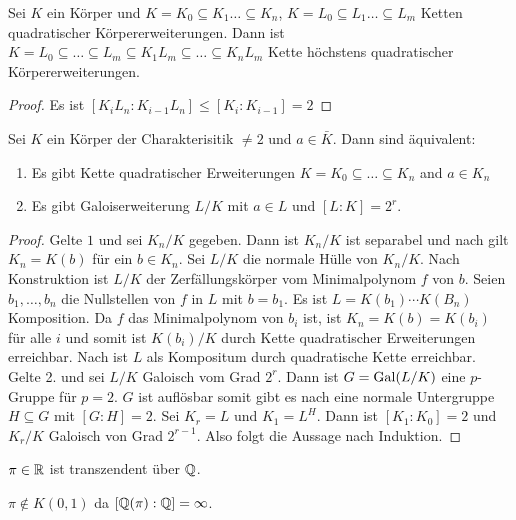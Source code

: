 \begin{Lemma}\label{Lem:KompQuad}
	Sei \(K\) ein Körper und \(K=K_0\subseteq K_1\dots\subseteq K_n\), \(K=L_0\subseteq L_1\dots\subseteq L_m\) Ketten quadratischer Körpererweiterungen.
	Dann ist \(K=L_0\subseteq \dots\subseteq L_m\subseteq K_1L_m\subseteq\dots \subseteq K_nL_m\) Kette höchstens quadratischer Körpererweiterungen.
\end{Lemma}
\begin{proof}
	Es ist \([K_iL_n:K_{i-1}L_n]\leq [K_i:K_{i-1}]=2\)
\end{proof}
\begin{Satz}
	Sei \(K\) ein Körper der Charakterisitik \(\neq 2\) und \(a\in\bar K\). Dann sind äquivalent:
	\begin{enumerate}
		\item Es gibt Kette quadratischer Erweiterungen \(K=K_0\subseteq \dots\subseteq K_n\) and \(a\in K_n\)
		\item Es gibt Galoiserweiterung \(L/K\) mit \(a\in L\) und \([L:K]=2^r\).
	\end{enumerate}
\end{Satz}
\begin{proof}
	Gelte \(1\) und sei \(K_n/K\) gegeben. Dann ist \(K_n/K\) ist separabel und nach  gilt \(K_n=K(b)\) für ein \(b\in K_n\). Sei \(L/K\) die normale Hülle von \(K_n/K\). Nach Konstruktion ist \(L/K\) der Zerfällungskörper vom Minimalpolynom \(f\) von \(b\). Seien \(b_1,\dots,b_n\) die Nullstellen von \(f\) in \(L\) mit \(b=b_1.\) Es ist \(L=K(b_1)\cdots K(B_n)\) Komposition. Da \(f\) das Minimalpolynom von \(b_i\) ist, ist \(K_n=K(b)=K(b_i)\) für alle \(i\) und somit ist \(K(b_i)/K\) durch Kette quadratischer Erweiterungen erreichbar. Nach  ist \(L\) als Kompositum durch quadratische Kette erreichbar. Gelte 2. und sei \(L/K\) Galoisch vom Grad \(2^r\). Dann ist \(G=\operatorname{Gal}(L/K)\) eine \(p\)-Gruppe für \(p=2\).
	\(G\) ist auflösbar somit gibt es nach  eine normale Untergruppe \(H\subseteq G\) mit \([G:H]=2\).
	Sei \(K_r=L\) und \(K_1=L^H\). Dann ist \([K_1:K_0]=2\) und \(K_r/K\) Galoisch von Grad \(2^{r-1}\). Also folgt die Aussage nach Induktion.
\end{proof}
\begin{Satz}
	\(\pi\in\mathbb{R}\) ist transzendent über \(\mathbb{Q}\).
\end{Satz}
\begin{Kor}
	\(\pi\not\in K(0,1)\) da \([\mathbb{Q}(\pi):\mathbb{Q}]=\infty\).
\end{Kor}
